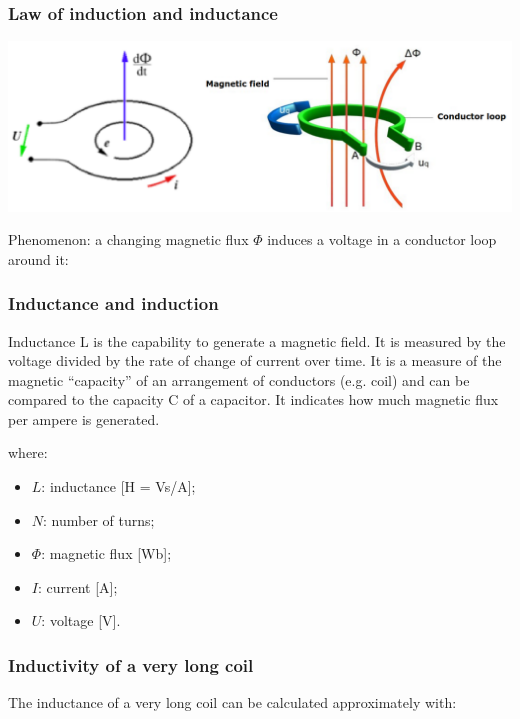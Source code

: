 \documentclass{article}
\begin{document}
\subsubsection{Law of induction and inductance}
\begin{center}
    \includegraphics[width=.8\textwidth]{media/law_of_induction.png}
\end{center}

Phenomenon: a changing magnetic flux $\Phi$ induces a
voltage in a conductor loop around it:

\newpage
\subsubsection{Inductance and induction}
Inductance L is the capability to generate a magnetic field. It is measured by
the voltage divided by the rate of change of current over time. It is a measure of
the magnetic ``capacity'' of an arrangement of conductors (e.g. coil) and can be
compared to the capacity C of a capacitor. It indicates how much magnetic flux
per ampere is generated.


where:
\begin{itemize}
    \item $L$: inductance [H = Vs/A];
    \item $N$: number of turns;
    \item $\Phi$: magnetic flux [Wb];
    \item $I$: current [A];
    \item $U$: voltage [V].
\end{itemize}

\subsubsection{Inductivity of a very long coil}
The inductance of a very long coil can be calculated approximately with:
\end{document}
